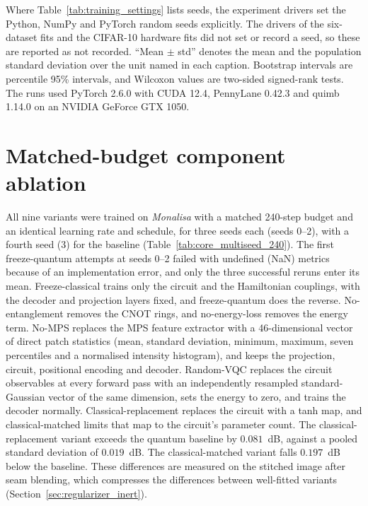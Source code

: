 \documentclass[pdflatex,sn-basic]{sn-jnl}
\begin{document}
\begin{appendices}
Where Table~\ref{tab:training_settings} lists seeds, the experiment drivers set the Python, NumPy and PyTorch random seeds explicitly.
The drivers of the six-dataset fits and the CIFAR-10 hardware fits did not set or record a seed, so these are reported as not recorded.
``Mean $\pm$ std'' denotes the mean and the population standard deviation over the unit named in each caption.
Bootstrap intervals are percentile 95\% intervals, and Wilcoxon values are two-sided signed-rank tests.
The runs used PyTorch 2.6.0 with CUDA 12.4, PennyLane 0.42.3 and quimb 1.14.0 on an NVIDIA GeForce GTX 1050.

\section{Matched-budget component ablation}
\label{sec:core_multiseed_rerun}

All nine variants were trained on \textit{Monalisa} with a matched 240-step budget and an identical learning rate and schedule, for three seeds each (seeds 0--2), with a fourth seed (3) for the baseline (Table~\ref{tab:core_multiseed_240}).
The first freeze-quantum attempts at seeds 0--2 failed with undefined (NaN) metrics because of an implementation error, and only the three successful reruns enter its mean.
Freeze-classical trains only the circuit and the Hamiltonian couplings, with the decoder and projection layers fixed, and freeze-quantum does the reverse.
No-entanglement removes the CNOT rings, and no-energy-loss removes the energy term.
No-MPS replaces the MPS feature extractor with a 46-dimensional vector of direct patch statistics (mean, standard deviation, minimum, maximum, seven percentiles and a normalised intensity histogram), and keeps the projection, circuit, positional encoding and decoder.
Random-VQC replaces the circuit observables at every forward pass with an independently resampled standard-Gaussian vector of the same dimension, sets the energy to zero, and trains the decoder normally.
Classical-replacement replaces the circuit with a tanh map, and classical-matched limits that map to the circuit's parameter count.
The classical-replacement variant exceeds the quantum baseline by $0.081$~dB, against a pooled standard deviation of $0.019$~dB.
The classical-matched variant falls $0.197$~dB below the baseline.
These differences are measured on the stitched image after seam blending, which compresses the differences between well-fitted variants (Section~\ref{sec:regularizer_inert}).


\end{appendices}
\end{document}
